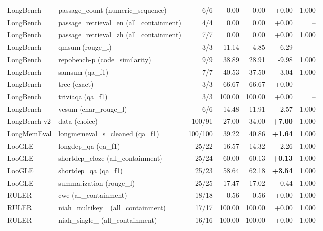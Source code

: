 \begin{longtable}{lp{3.1cm}rrrrr}
LongBench & \raggedright passage\_\allowbreak count {\tiny (numeric\_sequence)} & 6/6 & 0.00 & 0.00 & +0.00 & 1.000 \\
LongBench & \raggedright passage\_\allowbreak retrieval\_\allowbreak en {\tiny (all\_containment)} & 4/4 & 0.00 & 0.00 & +0.00 & -- \\
LongBench & \raggedright passage\_\allowbreak retrieval\_\allowbreak zh {\tiny (all\_containment)} & 7/7 & 0.00 & 0.00 & +0.00 & 1.000 \\
LongBench & \raggedright qmsum {\tiny (rouge\_l)} & 3/3 & 11.14 & 4.85 & -6.29 & -- \\
LongBench & \raggedright repobench-p {\tiny (code\_similarity)} & 9/9 & 38.89 & 28.91 & -9.98 & 1.000 \\
LongBench & \raggedright samsum {\tiny (qa\_f1)} & 7/7 & 40.53 & 37.50 & -3.04 & 1.000 \\
LongBench & \raggedright trec {\tiny (exact)} & 3/3 & 66.67 & 66.67 & +0.00 & -- \\
LongBench & \raggedright triviaqa {\tiny (qa\_f1)} & 3/3 & 100.00 & 100.00 & +0.00 & -- \\
LongBench & \raggedright vcsum {\tiny (char\_rouge\_l)} & 6/6 & 14.48 & 11.91 & -2.57 & 1.000 \\
LongBench v2 & \raggedright data {\tiny (choice)} & 100/91 & 27.00 & 34.00 & \textbf{+7.00} & 1.000 \\
LongMemEval & \raggedright longmemeval\_\allowbreak s\_\allowbreak cleaned {\tiny (qa\_f1)} & 100/100 & 39.22 & 40.86 & \textbf{+1.64} & 1.000 \\
LooGLE & \raggedright longdep\_\allowbreak qa {\tiny (qa\_f1)} & 25/22 & 16.57 & 14.32 & -2.26 & 1.000 \\
LooGLE & \raggedright shortdep\_\allowbreak cloze {\tiny (all\_containment)} & 25/24 & 60.00 & 60.13 & \textbf{+0.13} & 1.000 \\
LooGLE & \raggedright shortdep\_\allowbreak qa {\tiny (qa\_f1)} & 25/23 & 58.64 & 62.18 & \textbf{+3.54} & 1.000 \\
LooGLE & \raggedright summarization {\tiny (rouge\_l)} & 25/25 & 17.47 & 17.02 & -0.44 & 1.000 \\
RULER & \raggedright cwe {\tiny (all\_containment)} & 18/18 & 0.56 & 0.56 & +0.00 & 1.000 \\
RULER & \raggedright niah\_\allowbreak multikey\_\allowbreak 1 {\tiny (all\_containment)} & 17/17 & 100.00 & 100.00 & +0.00 & 1.000 \\
RULER & \raggedright niah\_\allowbreak single\_\allowbreak 1 {\tiny (all\_containment)} & 16/16 & 100.00 & 100.00 & +0.00 & 1.000 \\

\end{longtable}
